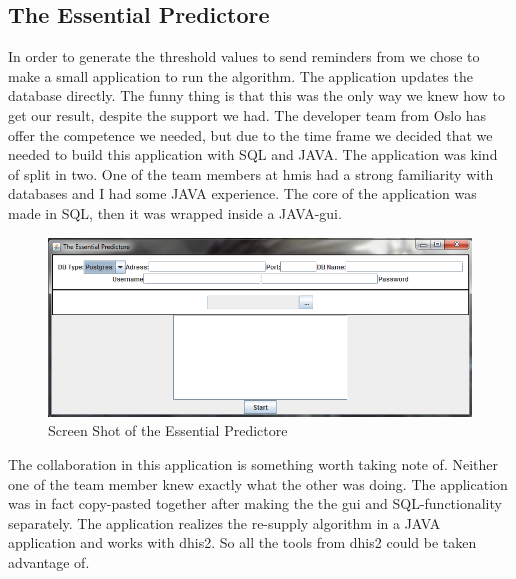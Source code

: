 \subsection{The Essential Predictore}
In order to generate the threshold values to send reminders from we chose to make a small application to run the algorithm. The application updates the database directly. The funny thing is that this was the only way we knew how to get our result, despite the support we had. The developer team from Oslo has offer the competence we needed, but due to the time frame we decided that we needed to build this application with SQL and JAVA. The application was kind of split in two. One of the team members at \gls{hmis} had a strong familiarity with databases and I had some JAVA experience. The core of the application was made in SQL, then it was wrapped inside a JAVA-\gls{gui}.

\begin{figure}
\centering
\includegraphics[width=\textwidth]{case/img/essentialPredictoreScreenShot}
\caption{Screen Shot of the Essential Predictore}
\label{fig:essPred}
\end{figure}

The collaboration in this application is something worth taking note of. Neither one of the team member knew exactly what the other was doing. The application was in fact copy-pasted together after making the the \gls{gui} and SQL-functionality separately. The application realizes the re-supply algorithm in a JAVA application and works with \gls{dhis2}. So all the tools from \gls{dhis2} could be taken advantage of. 